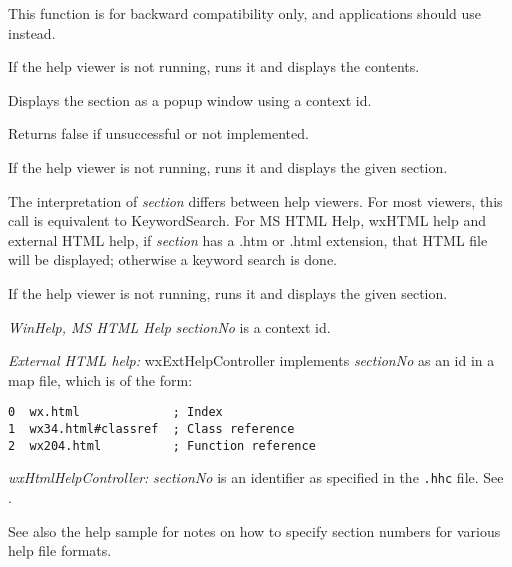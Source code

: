This function is for backward compatibility only, and applications should use  instead.

\label{wxhelpcontrollerdisplaycontents}


If the help viewer is not running, runs it and displays the
contents.

\label{wxhelpcontrollerdisplaycontextpopup}


Displays the section as a popup window using a context id.

Returns false if unsuccessful or not implemented.

\label{wxhelpcontrollerdisplaysection}


If the help viewer is not running, runs it and displays the given section.

The interpretation of {\it section} differs between help viewers. For most viewers,
this call is equivalent to KeywordSearch. For MS HTML Help, wxHTML help and external HTML help,
if {\it section} has a .htm
or .html extension, that HTML file will be displayed; otherwise
a keyword search is done.


If the help viewer is not running, runs it and displays the given section.

{\it WinHelp, MS HTML Help} {\it sectionNo} is a context id.

{\it External HTML help:} wxExtHelpController implements {\it sectionNo} as an id in a map file, which is of the form:

\begin{verbatim}
0  wx.html             ; Index
1  wx34.html#classref  ; Class reference
2  wx204.html          ; Function reference
\end{verbatim}

{\it wxHtmlHelpController:} {\it sectionNo} is an identifier as specified in the {\tt .hhc} file. See .

See also the help sample for notes on how to specify section numbers for various help file formats.

